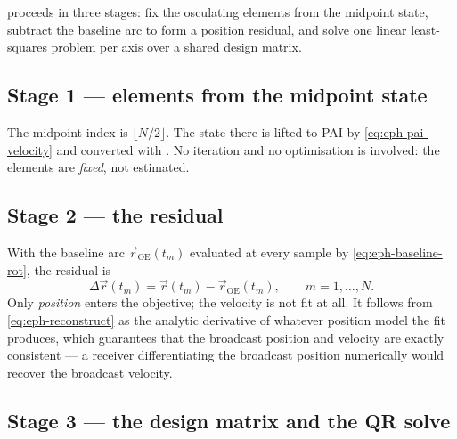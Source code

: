  \citep[\S7.3.1, Eqs.~7.5--7.7]{iiyama2026thesis}
proceeds in three stages: fix the osculating elements from the midpoint state,
subtract the baseline arc to form a position residual, and solve one linear
least-squares problem per axis over a shared design matrix.

\subsection{Stage 1 --- elements from the midpoint state}

The midpoint index is $\lfloor N/2\rfloor$. The state there is lifted to PAI
by \cref{eq:eph-pai-velocity} and converted with . No
iteration and no optimisation is involved: the elements are \emph{fixed}, not
estimated.

\subsection{Stage 2 --- the residual}

With the baseline arc $\vec{r}_\mathrm{OE}(t_m)$ evaluated at every sample by
\cref{eq:eph-baseline-rot}, the residual is
\begin{equation}
  \label{eq:eph-residual-def}
  \Delta\vec{r}(t_m) = \vec{r}(t_m) - \vec{r}_\mathrm{OE}(t_m),
  \qquad m = 1,\dots,N .
\end{equation}
Only \emph{position} enters the objective; the velocity is not fit at all. It
follows from \cref{eq:eph-reconstruct} as the analytic derivative of whatever
position model the fit produces, which guarantees that the broadcast position
and velocity are exactly consistent --- a receiver differentiating the
broadcast position numerically would recover the broadcast velocity.

\subsection{Stage 3 --- the design matrix and the QR solve}

